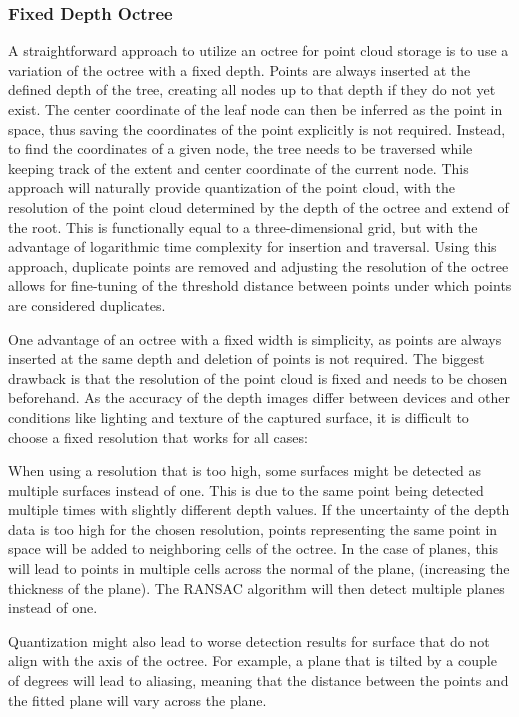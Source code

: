 \subsubsection{Fixed Depth Octree}
A straightforward approach to utilize an octree for point cloud storage is to use a variation of the octree with a fixed depth.
Points are always inserted at the defined depth of the tree, creating all nodes up to that depth if they do not yet exist.
The center coordinate of the leaf node can then be inferred as the point in space,
thus saving the coordinates of the point explicitly is not required.
Instead, to find the coordinates of a given node, the tree needs to be traversed while keeping track of
the extent and center coordinate of the current node.
This approach will naturally provide quantization of the point cloud, with the resolution of the point cloud
determined by the depth of the octree and extend of the root.
This is functionally equal to a three-dimensional grid,
but with the advantage of logarithmic time complexity for insertion and traversal.
Using this approach, duplicate points are removed and adjusting the resolution of the octree
allows for fine-tuning of the threshold distance between points under which points are considered duplicates.

One advantage of an octree with a fixed width is simplicity, as points are always inserted at the same depth and deletion of points is not required.
The biggest drawback is that the resolution of the point cloud is fixed and needs to be chosen beforehand.
As the accuracy of the depth images differ between devices and other conditions like lighting and texture of the captured surface,
it is difficult to choose a fixed resolution that works for all cases:

When using a resolution that is too high, some surfaces might be detected as multiple surfaces instead of one.
This is due to the same point being detected multiple times with slightly different depth values.
If the uncertainty of the depth data is too high for the chosen resolution,
points representing the same point in space will be added to neighboring cells of the octree.
In the case of planes, this will lead to points in multiple cells across the normal of the plane,
(increasing the thickness of the plane).
The RANSAC algorithm will then detect multiple planes instead of one.

Quantization might also lead to worse detection results for surface that do not align with the axis of the octree.
For example, a plane that is tilted by a couple of degrees will lead to aliasing,
meaning that the distance between the points and the fitted plane will vary across the plane.


